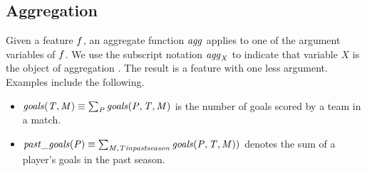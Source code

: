 \documentclass[conference]{IEEEtran}
\newcommand{\team}{T}
\newcommand{\player}{P}
\newcommand{\match}{M}
\newcommand{\plusminus}{\mbox{+/-}}
\newcommand{\aggregate}{\it{agg}}
\begin{document}
\subsection{Aggregation} Given a feature $f$, an aggregate function $\aggregate$ applies to one of the argument variables of $f$. We use the subscript notation $\aggregate_{X}$ to indicate that variable $X$ is the object of aggregation \cite{Popescul2007}. The result is a feature with one less argument. Examples include the following.

\begin{itemize}
\item $\it{goals}(\team,\match) \equiv \sum_{\player} \it{goals}(\player,\team,\match)$ is the number of goals scored by a team in a match.
\item $\it{past}\_\it{goals}(\player) \equiv \sum_{\match,\team \mbox{ in past season}} \it{goals}(\player,\team,\match))$ denotes the sum of a player's goals in the past season.
\end{itemize}


%
\end{document}
